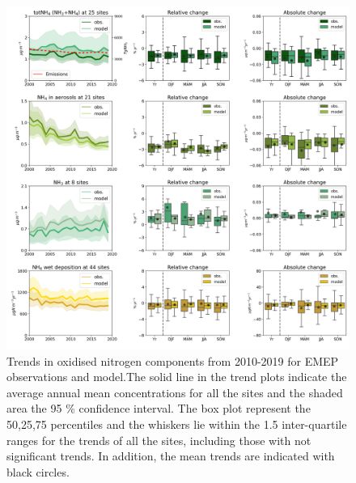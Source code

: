 \begin{figure}
	\centering
	\includegraphics[width=0.74\paperwidth]{FIGS_TRENDS/Nred_trends.png}
	\caption{\label{fig:Nred_trends}Trends in oxidised nitrogen components from 2010-2019 for EMEP observations and model.The solid line in the trend plots indicate the average annual mean concentrations for all the sites and the shaded area the 95 \% confidence interval. The box plot represent the 50,25,75 percentiles and the whiskers lie within the 1.5 inter-quartile ranges for the trends of all the sites, including those with not significant trends. In addition, the mean trends are indicated with black circles.}
\end{figure}



